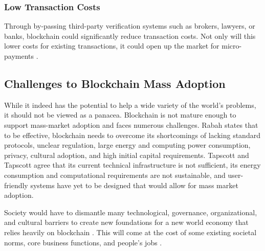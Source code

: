\documentclass[sigconf]{acmart}
\begin{document}
\subsubsection{Low Transaction Costs} Through by-passing third-party verification systems such as brokers, lawyers, or banks, blockchain could significantly reduce transaction costs. Not only will this lower costs for existing transactions, it could open up the market for micro-payments \cite{hbr}. 

\subsection{Challenges to Blockchain Mass Adoption}
While it indeed has the potential to help a wide variety of the world's problems, it should not be viewed as a panacea.  Blockchain is not mature enough to support mass-market adoption and faces numerous challenges. Rabah \cite{rabah2017overview} states that to be effective, blockchain needs to overcome its shortcomings of lacking standard protocols, unclear regulation, large energy and computing power consumption, privacy, cultural adoption, and high initial capital requirements. Tapscott and Tapscott \cite{tapscott} agree that its current technical infrastructure is not sufficient, its energy consumption and computational requirements are not sustainable, and user-friendly systems have yet to be designed that would allow for mass market adoption.

Society would have to dismantle many technological, governance, organizational, and cultural barriers to create new foundations for a new world economy that relies heavily on blockchain \cite{hbr}. This will come at the cost of some existing societal norms, core business functions, and people's jobs \cite{hbr} \cite{rabah2017overview}. 
\end{document}
